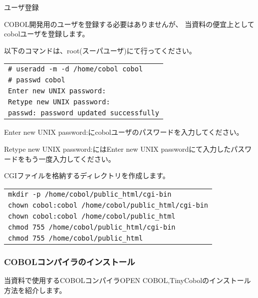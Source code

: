 {\gt ユーザ登録}

COBOL開発用のユーザを登録する必要はありませんが、
当資料の便宜上として{\gt cobol}ユーザを登録します。

以下のコマンドは、root(スーパユーザ)にて行ってください。

\begin{tabular}{|l|}
\hline
\verb&# useradd -m -d /home/cobol cobol&\\
\verb&# passwd cobol&\\
\verb&Enter new UNIX password: &\\
\verb&Retype new UNIX password: &\\
\verb&passwd: password updated successfully&\\
\hline
\end{tabular}
Enter new UNIX password:にcobolユーザのパスワードを入力してください。

Retype new UNIX password:にはEnter new UNIX passwordにて入力したパスワードをもう一度入力してください。

CGIファイルを格納するディレクトリを作成します。

\begin{tabular}{|l|}
\hline
\verb&mkdir -p /home/cobol/public_html/cgi-bin&\\
\verb&chown cobol:cobol /home/cobol/public_html/cgi-bin&\\
\verb&chown cobol:cobol /home/cobol/public_html&\\
\verb&chmod 755 /home/cobol/public_html/cgi-bin&\\
\verb&chmod 755 /home/cobol/public_html&\\
\hline
\end{tabular}

 
\subsubsection{COBOLコンパイラのインストール}

当資料で使用するCOBOLコンパイラOPEN COBOL,TinyCobolのインストール方法を紹介します。

